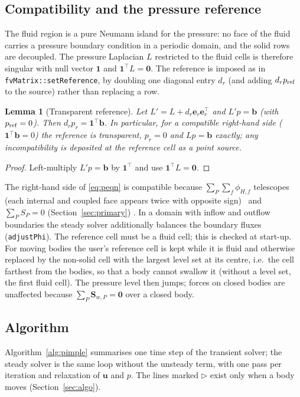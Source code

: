 \documentclass[11pt,a4paper]{article}
\newtheorem{lemma}{Lemma}
\theoremstyle{remark}
\newcommand{\uu}{\bm{u}}
\newcommand{\code}[1]{\texttt{#1}}
\begin{document}
\subsection{Compatibility and the pressure reference}
\label{sec:reference}

The fluid region is a pure Neumann island for the pressure: no face of the fluid carries a
pressure boundary condition in a periodic domain, and the solid rows are decoupled. The
pressure Laplacian $L$ restricted to the fluid cells is therefore singular with null vector
$\bm 1$ and $\bm 1^{\!\top}L=\bm 0$. The reference is imposed as in
\code{fvMatrix::setReference}, by doubling one diagonal entry $d_r$ (and adding $d_rp_{\rm
ref}$ to the source) rather than replacing a row.

\begin{lemma}[Transparent reference]
\label{lem:reference}
Let $L'=L+d_r\bm e_r\bm e_r^{\!\top}$ and $L'p=\bm b$ (with $p_{\rm ref}=0$). Then
$d_rp_r=\bm 1^{\!\top}\bm b$. In particular, for a compatible right-hand side
($\bm 1^{\!\top}\bm b=0$) the reference is transparent, $p_r=0$ and $Lp=\bm b$ exactly; any
incompatibility is deposited at the reference cell as a point source.
\end{lemma}
\begin{proof}
Left-multiply $L'p=\bm b$ by $\bm 1^{\!\top}$ and use $\bm 1^{\!\top}L=\bm 0$.
\end{proof}

The right-hand side of \eqref{eq:peqn} is compatible because $\sum_P\sum_f\phi_{H,f}$
telescopes (each internal and coupled face appears twice with opposite sign)%
\ and $\sum_PS_P=0$ (Section~\ref{sec:primary})%
. In a domain with inflow and outflow boundaries the steady solver additionally balances the
boundary fluxes (\code{adjustPhi}). The reference cell must be a fluid cell; this is checked
at start-up.
For moving bodies the user's reference cell is kept while it is fluid and otherwise replaced by
the non-solid cell with the largest level set at its centre, i.e.\ the cell farthest from the
bodies, so that a body cannot swallow it (without a level set, the first fluid cell). The
pressure level then jumps; forces on closed bodies are unaffected because $\sum_P\bm S_{w,P}=\bm 0$
over a closed body.

\subsection{Algorithm}
\label{sec:algstatic}

Algorithm~\ref{alg:pimple} summarises one time step of the transient solver; the steady solver
is the same loop without the unsteady term, with one pass per iteration and relaxation of
$\uu$ and $p$.
The lines marked $\triangleright$ exist only when a body moves
(Section~\ref{sec:algo}).
\end{document}
